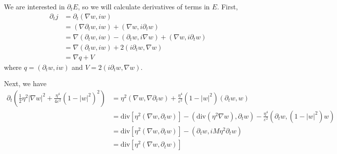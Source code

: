 \documentclass[a4paper]{article}
\renewcommand{\div}{\mathrm{div}}
\begin{document}
We are interested in $\partial_t E$, so we will calculate derivatives of terms in $E$.
First,
\begin{align*}
  \partial_t j &= \partial_t ( \nabla w, iw ) \\
  &= ( \nabla \partial_t w, iw ) + ( \nabla w, i \partial_t w) \\
  &= \nabla ( \partial_t w, iw ) - ( \partial_t w, i \nabla w ) + ( \nabla w, i \partial_t w ) \\
  &= \nabla ( \partial_t w, iw ) + 2( i \partial_t w, \nabla w ) \\
  &= \nabla q + V
\end{align*}
where $q = (\partial_t w, iw )$ and $V = 2 (i \partial_t w, \nabla w)$.

Next, we have
\begin{align*}
  \partial_t \left( \frac{1}{2} \eta^2 |\nabla w|^2 + \frac{\eta^4}{4\varepsilon^2} ( 1 - |w|^2)^2 \right)
  &= \eta^2 ( \nabla w, \nabla \partial_t w ) + \frac{\eta^4}{\varepsilon^2} ( 1 - |w|^2 )(\partial_t w, w) \\
  &= \div \left[ \eta^2 ( \nabla w, \partial_t w) \right] - ( \div(\eta^2 \nabla w), \partial_t w) - \frac{\eta^4}{\varepsilon^2} ( \partial_t w,
  (1-|w|^2)w) \\
  &= \div \left[ \eta^2 ( \nabla w, \partial_t w) \right] - ( \partial_t w, i M \eta^2 \partial_t w ) \\
  &= \div \left[ \eta^2 ( \nabla w, \partial_t w) \right]
\end{align*}
\end{document}
